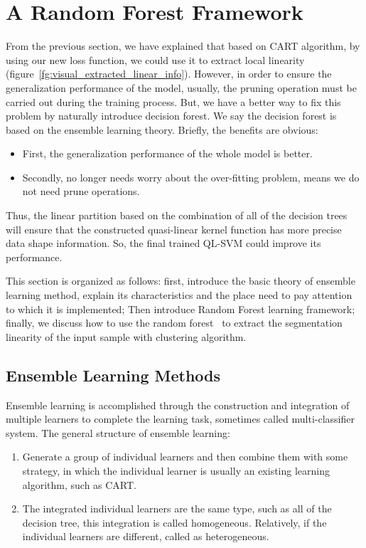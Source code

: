 \documentclass[master]{IPSstyle}
\begin{document}
{\section{A Random Forest Framework}
From the previous section, we have explained that based on CART algorithm, by using our new loss function, we could use it to extract local linearity (figure~\ref{fg:visual_extracted_linear_info}). However, in order to ensure the generalization performance of the model, usually, the pruning operation must be carried out during the training process. But, we have a better way to fix this problem by naturally introduce decision forest. We say the decision forest is based on the ensemble learning theory. Briefly, the benefits are obvious:
\begin{itemize}
\item First, the generalization performance of the whole model is better.
\item Secondly, no longer needs worry about the over-fitting problem, means we do not need prune operations.
\end{itemize} 

Thus, the linear partition based on the combination of all of the decision trees will ensure that the constructed quasi-linear kernel function has more precise data shape information. So, the final trained QL-SVM could improve its performance.

This section is organized as follows: first, introduce the basic theory of ensemble learning method, explain its characteristics and the place need to pay attention to which it is implemented; Then introduce Random Forest learning framework; finally, we discuss how to use the random forest~\cite{breiman2001random} to extract the segmentation linearity of the input sample with clustering algorithm.

\subsection{Ensemble Learning Methods}
Ensemble learning is accomplished through the construction and integration of multiple learners to complete the learning task, sometimes called multi-classifier system. The general structure of ensemble learning: 
\begin{enumerate}
\item Generate a group of individual learners and then combine them with some strategy, in which the individual learner is usually an existing learning algorithm, such as CART. 
\item The integrated individual learners are the same type, such as all of the decision tree, this integration is called homogeneous. Relatively, if the individual learners are different, called as heterogeneous.
\end{enumerate}

}
\end{document}
